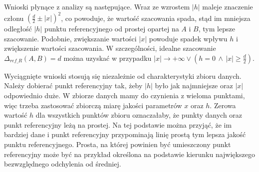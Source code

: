 Wnioski płynące z analizy są następujące. Wraz ze wzrostem $ |h| $ maleje znaczenie członu $ (\frac{d}{2} \pm |x|)^2 $, co powoduje, że wartość szacowania spada, stąd im mniejsza odległość $ |h| $ punktu referencyjnego od prostej opartej na $ A $ i $ B $, tym lepsze szacowanie. Podobnie, zwiększanie wartości $ |x| $ powoduje spadek wpływu $ h $ i zwiększenie wartości szacowania. W szczególności, idealne szacowanie $ \Delta_{ref\_R}(A,B) = d $ można uzyskać w przypadku $ |x| \to +\infty \lor (h=0 \,\land\, |x| \ge \frac{d}{2}) $.\par
Wyciągnięte wnioski stosują się niezależnie od charakterystyki zbioru danych. Należy dobierać punkt referencyjny tak, żeby $ |h| $ było jak najmniejsze oraz $ |x| $ odpowiednio duże. W zbiorze danych mamy do czynienia z wieloma punktami, więc trzeba zastosować zbiorczą miarę jakości parametrów $ x $ oraz $ h $. Zerowa wartość $ h $ dla wszystkich punktów zbioru oznaczałaby, że punkty danych oraz punkt referencyjny leżą na prostej. Na tej podstawie można przyjąć, że im bardziej dane i punkt referencyjny przypominają linię prostą tym lepsza jakość punktu referencyjnego. Prosta, na której powinien być umieszczony punkt referencyjny może być na przykład określona na podstawie kierunku największego bezwzględnego odchylenia od średniej.

